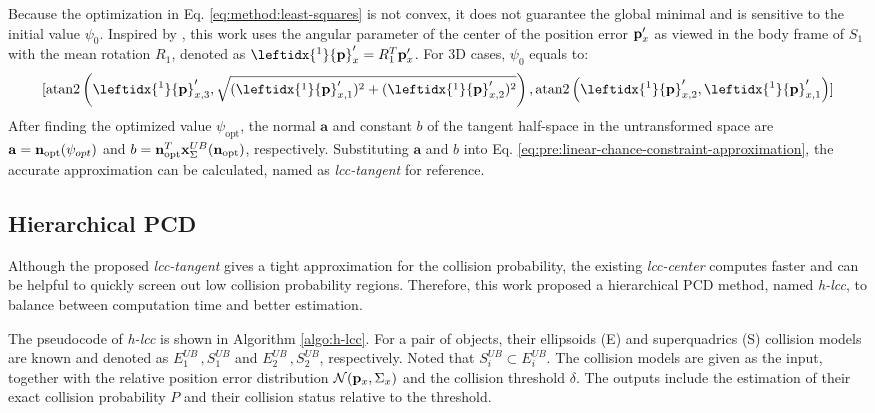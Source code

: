 \documentclass[conference]{IEEEtran}
\newcommand{\xx}{{\bf x}}
\newcommand{\pp}{{\bf p}}
\newcommand{\nn}{{\bf n}}
\begin{document}
Because the optimization in Eq. \ref{eq:method:least-squares} is not convex, it does not guarantee the global minimal and is sensitive to the initial value $\psi_0$. Inspired by \cite{ruan2022collision}, this work uses the angular parameter of the center of the position error $\pp_x'$ as viewed in the body frame of $S_1$ with the mean rotation $R_1$, denoted as $ \leftidx{^1}\pp_x'=R_1^T\pp_x'$. For 3D cases, $\psi_0$ equals to:
$$ [ \text{atan2}\left( \leftidx{^1}\pp_{x,3}', \sqrt{(\leftidx{^1}\pp_{x,1}')^2 + (\leftidx{^1}\pp_{x,2}')^2} \right), \text{atan2}\left(\leftidx{^1}\pp_{x,2}', \leftidx{^1}\pp_{x,1}'\right) ] $$
After finding the optimized value $\psi_{\text{opt}}$, the normal $\mathbf{a}$ and constant $b$ of the tangent half-space in the untransformed space are $\mathbf{a} = \nn_{\text{opt}}(\psi_{opt})$ and $ b = \nn_{\text{opt}}^T \xx_\Sigma^{UB}(\nn_{\text{opt}})$, respectively. Substituting $\mathbf{a}$ and $b$ into Eq. \ref{eq:pre:linear-chance-constraint-approximation}, the accurate approximation can be calculated, named as \textit{\textit{lcc-tangent}} for reference. 


\subsection{Hierarchical PCD}
Although the proposed \textit{\textit{lcc-tangent}} gives a tight approximation for the collision probability, the existing \textit{lcc-center} computes faster and can be helpful to quickly screen out low collision probability regions. Therefore, this work proposed a hierarchical PCD method, named \textit{h-lcc}, to balance between computation time and better estimation. 

The pseudocode of \textit{h-lcc} is shown in Algorithm \ref{algo:h-lcc}. For a pair of objects, their ellipsoids (E) and superquadrics (S) collision models are known and denoted as $E_1^{UB}\,,S_1^{UB}$ and $E_2^{UB}\,,S_2^{UB}$, respectively. Noted that $S_i^{UB} \subset E_i^{UB}$. The collision models are given as the input, together with the relative position error distribution $\mathcal{N}(\pp_x, \Sigma_x)$ and the collision threshold $\delta$. The outputs include the estimation of their exact collision probability $P$ and their collision status relative to the threshold. 
\end{document}
